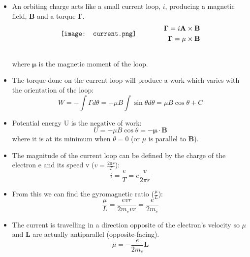 \documentclass[12pt, letterpaper, twoside]{article}
\begin{document}
\begin{itemize}
    \item An orbiting charge acts like a small current loop, $i$, producing a magnetic field, \textbf{B} and a torque $\mathbf{\Gamma}$.
    \begin{align}
    \vcenter{\hbox{\texttt{[image: current.png]}}}
        &\qquad\qquad
        \begin{aligned}
            \mathbf{\Gamma} = i\mathbf{A} \times \mathbf{B} \\
            \mathbf{\Gamma} = \mathbf{\mu} \times \mathbf{B}
        \end{aligned}\\
        \vcenter{\hbox{\begin{minipage}{6cm}
        \end{minipage}}}
        & \notag
    \end{align}
    where $\mathbf{\mu}$ is the magnetic moment of the loop.
    \item The torque done on the current loop will produce a work which varies with the orientation of the loop:
    \begin{equation*}
        W = - \int \Gamma d\theta = -\mu B\int \sin{\theta} d\theta = \mu B\cos{\theta} + C
    \end{equation*}
    \item Potential energy U is the negative of work:
    \begin{equation}
        U = -\mu B\cos{\theta} = -\mathbf{\mu \cdot B}
    \end{equation}
    where it is at its minimum when $\theta = 0$ (or $\mu$ is parallel to $\mathbf{B}$). 
    \item The magnitude of the current loop can be defined by the charge of the electron e and its speed v ($v = \frac{2\pi r}{T}$):
    \begin{equation*}
        i = \frac{e}{T} = e\frac{v}{2\pi r}
    \end{equation*}
    \item From this we can find the gyromagnetic ratio ($\frac{\mu}{L}$):
    \begin{equation*}
        \frac{\mu}{L} = \frac{evr}{2m_evr} = \frac{e}{2m_e}
    \end{equation*}
    \item The current is travelling in a direction opposite of the electron's velocity so $\mu$ and $\mathbf{L}$ are actually antiparallel (opposite-facing).
    \begin{equation*}
        \mu = -\frac{e}{2m_e}\mathbf{L}
    \end{equation*}
\end{itemize}
\end{document}
